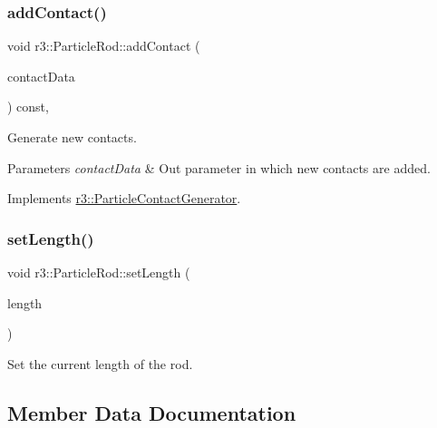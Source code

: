 \subsubsection{\texorpdfstring{add\+Contact()}{addContact()}}
{\footnotesize\ttfamily void r3\+::\+Particle\+Rod\+::add\+Contact (\begin{DoxyParamCaption}\item[{\mbox{\hyperlink{classr3_1_1_fixed_size_container}{Fixed\+Size\+Container}}$<$ \mbox{\hyperlink{classr3_1_1_particle_contact}{Particle\+Contact}} $>$ \&}]{contact\+Data }\end{DoxyParamCaption}) const\hspace{0.3cm}{\ttfamily [override]}, {\ttfamily [virtual]}}



Generate new contacts. 


\begin{DoxyParams}{Parameters}
{\em contact\+Data} & Out parameter in which new contacts are added. \\
\hline
\end{DoxyParams}


Implements \mbox{\hyperlink{classr3_1_1_particle_contact_generator_a39a7a8f0d5b31b1ca2c2ace2af8e2978}{r3\+::\+Particle\+Contact\+Generator}}.

\mbox{\label{classr3_1_1_particle_rod_af81456ae2749d12bf7fa7bf265fc4c23}} 
\subsubsection{\texorpdfstring{set\+Length()}{setLength()}}
{\footnotesize\ttfamily void r3\+::\+Particle\+Rod\+::set\+Length (\begin{DoxyParamCaption}\item[{\mbox{\hyperlink{namespacer3_ab2016b3e3f743fb735afce242f0dc1eb}{real}}}]{length }\end{DoxyParamCaption})}



Set the current length of the rod. 



\subsection{Member Data Documentation}
\mbox{\label{classr3_1_1_particle_rod_af146e442c0ddcb83161f115da58fa026}} 
